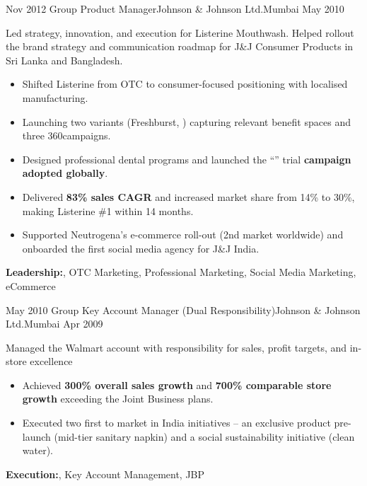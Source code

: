\begin{experiences}
  \experience
    {Nov 2012}     {Group Product Manager}{Johnson \& Johnson Ltd.}{Mumbai}
    {May 2010}    {
Led strategy, innovation, and execution for Listerine Mouthwash. Helped rollout the brand strategy and communication roadmap for J\&J Consumer Products in Sri Lanka and Bangladesh.
                      \begin{itemize}
        \item {Shifted Listerine from OTC to consumer-focused positioning with localised manufacturing.} 
        \item {Launching two variants (Freshburst, {}) capturing relevant benefit spaces and three 360\textdegree campaigns.}
        \item {Designed professional dental programs and launched the “{}” trial \textbf{campaign adopted globally}.}
        \item {Delivered \textbf{83\% sales CAGR} and increased market share from 14\% to 30\%, making Listerine \#1 within 14 months.}
        \item {Supported Neutrogena’s e-commerce roll-out (2nd market worldwide) and onboarded the first social media agency for J\&J India.}
                      \end{itemize}
                    }
        {\textbf{Leadership:}, OTC Marketing, Professional Marketing, Social Media Marketing, eCommerce} 
  \emptySeparator

 \experience
  {May 2010}  {Group Key Account Manager (Dual Responsibility)}{Johnson \& Johnson Ltd.}{Mumbai}
  {Apr 2009}   {
Managed the Walmart account with responsibility for sales, profit targets, and in-store excellence
                      \begin{itemize}
        \item {Achieved \textbf{300\% overall sales growth} and \textbf{700\% comparable store growth} exceeding the Joint Business plans.}
        \item {Executed two first to market in India initiatives – an exclusive product pre-launch (mid-tier sanitary napkin) and a social sustainability initiative (clean water).}
                      \end{itemize}
                  }
        {\textbf{Execution:}, Key Account Management, JBP}
   \emptySeparator


\end{experiences}
